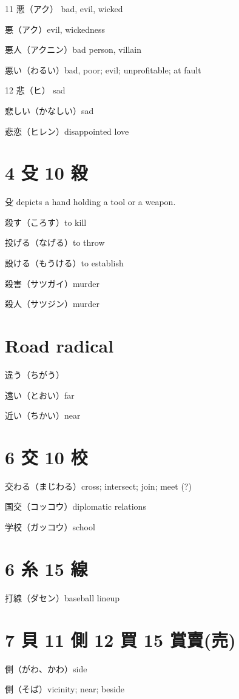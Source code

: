 11 悪（アク） bad, evil, wicked

悪（アク）evil, wickedness

悪人（アクニン）bad person, villain

悪い（わるい）bad, poor; evil; unprofitable; at fault

12 悲（ヒ） sad

悲しい（かなしい）sad

悲恋（ヒレン）disappointed love

\section{4 殳 10 殺}

殳 depicts a hand holding a tool or a weapon.

殺す（ころす）to kill

投げる（なげる）to throw

設ける（もうける）to establish

殺害（サツガイ）murder

殺人（サツジン）murder

\section{Road radical}

違う（ちがう）

遠い（とおい）far

近い（ちかい）near

\section{6 交 10 校}

交わる（まじわる）cross; intersect; join; meet (?)

国交（コッコウ）diplomatic relations

学校（ガッコウ）school

\section{6 糸 15 線}

打線（ダセン）baseball lineup

\section{7 貝 11 側 12 買 15 賞賣(売)}

側（がわ、かわ）side

側（そば）vicinity; near; beside

